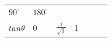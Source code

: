 {{\begin{center}
\begin{xtabular}[t]{|l|l|l|l|l|l|l|}
    
        
                  \begin{math}{90}^{\circ }\end{math}
                 &
    
    
        
                  \begin{math}{180}^{\circ }\end{math}
     \tabularnewline{}
    
    
        
                  \begin{math}tan\theta \end{math}
                 &
    
    
        0 &
    
    
        
                  \begin{math}\frac{1}{\sqrt{3}}\end{math}
                 &
    
    
        1 &
    

\end{xtabular}
\end{center}}}
